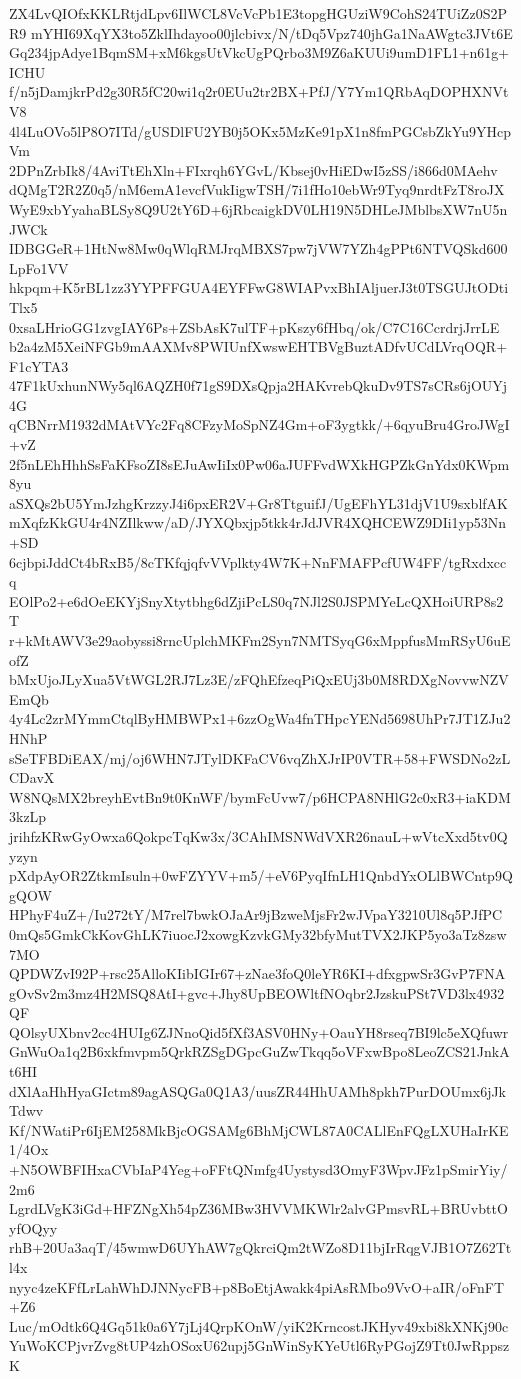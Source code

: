 ZX4LvQIOfxKKLRtjdLpv6IlWCL8VcVcPb1E3topgHGUziW9CohS24TUiZz0S2PR9
mYHI69XqYX3to5ZklIhdayoo00jlcbivx/N/tDq5Vpz740jhGa1NaAWgtc3JVt6E
Gq234jpAdye1BqmSM+xM6kgsUtVkcUgPQrbo3M9Z6aKUUi9umD1FL1+n61g+ICHU
f/n5jDamjkrPd2g30R5fC20wi1q2r0EUu2tr2BX+PfJ/Y7Ym1QRbAqDOPHXNVtV8
4l4LuOVo5lP8O7ITd/gUSDlFU2YB0j5OKx5MzKe91pX1n8fmPGCsbZkYu9YHcpVm
2DPnZrbIk8/4AviTtEhXln+FIxrqh6YGvL/Kbsej0vHiEDwI5zSS/i866d0MAehv
dQMgT2R2Z0q5/nM6emA1evcfVukIigwTSH/7i1fHo10ebWr9Tyq9nrdtFzT8roJX
WyE9xbYyahaBLSy8Q9U2tY6D+6jRbcaigkDV0LH19N5DHLeJMblbsXW7nU5nJWCk
IDBGGeR+1HtNw8Mw0qWlqRMJrqMBXS7pw7jVW7YZh4gPPt6NTVQSkd600LpFo1VV
hkpqm+K5rBL1zz3YYPFFGUA4EYFFwG8WIAPvxBhIAljuerJ3t0TSGUJtODtiTlx5
0xsaLHrioGG1zvgIAY6Ps+ZSbAsK7ulTF+pKszy6fHbq/ok/C7C16CcrdrjJrrLE
b2a4zM5XeiNFGb9mAAXMv8PWIUnfXwswEHTBVgBuztADfvUCdLVrqOQR+F1cYTA3
47F1kUxhunNWy5ql6AQZH0f71gS9DXsQpja2HAKvrebQkuDv9TS7sCRs6jOUYj4G
qCBNrrM1932dMAtVYc2Fq8CFzyMoSpNZ4Gm+oF3ygtkk/+6qyuBru4GroJWgI+vZ
2f5nLEhHhhSsFaKFsoZI8sEJuAwIiIx0Pw06aJUFFvdWXkHGPZkGnYdx0KWpm8yu
aSXQs2bU5YmJzhgKrzzyJ4i6pxER2V+Gr8TtguifJ/UgEFhYL31djV1U9sxblfAK
mXqfzKkGU4r4NZIlkww/aD/JYXQbxjp5tkk4rJdJVR4XQHCEWZ9DIi1yp53Nn+SD
6cjbpiJddCt4bRxB5/8cTKfqjqfvVVplkty4W7K+NnFMAFPcfUW4FF/tgRxdxccq
EOlPo2+e6dOeEKYjSnyXtytbhg6dZjiPcLS0q7NJl2S0JSPMYeLcQXHoiURP8s2T
r+kMtAWV3e29aobyssi8rncUplchMKFm2Syn7NMTSyqG6xMppfusMmRSyU6uEofZ
bMxUjoJLyXua5VtWGL2RJ7Lz3E/zFQhEfzeqPiQxEUj3b0M8RDXgNovvwNZVEmQb
4y4Lc2zrMYmmCtqlByHMBWPx1+6zzOgWa4fnTHpcYENd5698UhPr7JT1ZJu2HNhP
sSeTFBDiEAX/mj/oj6WHN7JTylDKFaCV6vqZhXJrIP0VTR+58+FWSDNo2zLCDavX
W8NQsMX2breyhEvtBn9t0KnWF/bymFcUvw7/p6HCPA8NHlG2c0xR3+iaKDM3kzLp
jrihfzKRwGyOwxa6QokpcTqKw3x/3CAhIMSNWdVXR26nauL+wVtcXxd5tv0Qyzyn
pXdpAyOR2ZtkmIsuln+0wFZYYV+m5/+eV6PyqIfnLH1QnbdYxOLlBWCntp9QgQOW
HPhyF4uZ+/Iu272tY/M7rel7bwkOJaAr9jBzweMjsFr2wJVpaY3210Ul8q5PJfPC
0mQs5GmkCkKovGhLK7iuocJ2xowgKzvkGMy32bfyMutTVX2JKP5yo3aTz8zsw7MO
QPDWZvI92P+rsc25AlloKIibIGIr67+zNae3foQ0leYR6KI+dfxgpwSr3GvP7FNA
gOvSv2m3mz4H2MSQ8AtI+gvc+Jhy8UpBEOWltfNOqbr2JzskuPSt7VD3lx4932QF
QOlsyUXbnv2cc4HUIg6ZJNnoQid5fXf3ASV0HNy+OauYH8rseq7BI9lc5eXQfuwr
GnWuOa1q2B6xkfmvpm5QrkRZSgDGpcGuZwTkqq5oVFxwBpo8LeoZCS21JnkAt6HI
dXlAaHhHyaGIctm89agASQGa0Q1A3/uusZR44HhUAMh8pkh7PurDOUmx6jJkTdwv
Kf/NWatiPr6IjEM258MkBjcOGSAMg6BhMjCWL87A0CALlEnFQgLXUHaIrKE1/4Ox
+N5OWBFIHxaCVbIaP4Yeg+oFFtQNmfg4Uystysd3OmyF3WpvJFz1pSmirYiy/2m6
LgrdLVgK3iGd+HFZNgXh54pZ36MBw3HVVMKWlr2alvGPmsvRL+BRUvbttOyfOQyy
rhB+20Ua3aqT/45wmwD6UYhAW7gQkrciQm2tWZo8D11bjIrRqgVJB1O7Z62Ttl4x
nyyc4zeKFfLrLahWhDJNNycFB+p8BoEtjAwakk4piAsRMbo9VvO+aIR/oFnFT+Z6
Luc/mOdtk6Q4Gq51k0a6Y7jLj4QrpKOnW/yiK2KrncostJKHyv49xbi8kXNKj90c
YuWoKCPjvrZvg8tUP4zhOSoxU62upj5GnWinSyKYeUtl6RyPGojZ9Tt0JwRppszK
